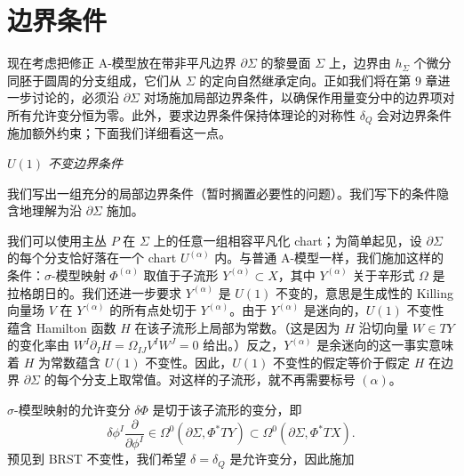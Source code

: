 
\section{边界条件}

现在考虑把修正 A-模型放在带非平凡边界 $\partial\Sigma$ 的黎曼面 $\Sigma$ 上，边界由 $h_\Sigma$ 个微分同胚于圆周的分支组成，它们从 $\Sigma$ 的定向自然继承定向。正如我们将在第 9 章进一步讨论的，必须沿 $\partial\Sigma$ 对场施加局部边界条件，以确保作用量变分中的边界项对所有允许变分恒为零。此外，要求边界条件保持体理论的对称性 $\delta_Q$ 会对边界条件施加额外约束；下面我们详细看这一点。

\noindent\emph{$U(1)$ 不变边界条件}

我们写出一组充分的局部边界条件（暂时搁置必要性的问题）。我们写下的条件隐含地理解为沿 $\partial\Sigma$ 施加。

我们可以使用主丛 $P$ 在 $\Sigma$ 上的任意一组相容平凡化 chart；为简单起见，设 $\partial\Sigma$ 的每个分支恰好落在一个 chart $U^{(\alpha)}$ 内。与普通 A-模型一样，我们施加这样的条件：$\sigma$-模型映射 $\Phi^{(\alpha)}$ 取值于子流形 $Y^{(\alpha)}\subset X$，其中 $Y^{(\alpha)}$ 关于辛形式 $\Omega$ 是拉格朗日的。我们还进一步要求 $Y^{(\alpha)}$ 是 $U(1)$ 不变的，意思是生成性的 Killing 向量场 $V$ 在 $Y^{(\alpha)}$ 的所有点处切于 $Y^{(\alpha)}$。由于 $Y^{(\alpha)}$ 是迷向的，$U(1)$ 不变性蕴含 Hamilton 函数 $H$ 在该子流形上局部为常数。（这是因为 $H$ 沿切向量 $W\in TY$ 的变化率由 $W^I\partial_IH=\Omega_{IJ}V^IW^J=0$ 给出。）反之，$Y^{(\alpha)}$ 是余迷向的这一事实意味着 $H$ 为常数蕴含 $U(1)$ 不变性。因此，$U(1)$ 不变性的假定等价于假定 $H$ 在边界 $\partial\Sigma$ 的每个分支上取常值。对这样的子流形，就不再需要标号 $(\alpha)$。

$\sigma$-模型映射的允许变分 $\delta\Phi$ 是切于该子流形的变分，即
\[
\delta\phi^I\frac{\partial}{\partial\phi^I}\in\Omega^0(\partial\Sigma,\Phi^*TY)\subset\Omega^0(\partial\Sigma,\Phi^*TX).
\]
预见到 BRST 不变性，我们希望 $\delta=\delta_Q$ 是允许变分，因此施加

